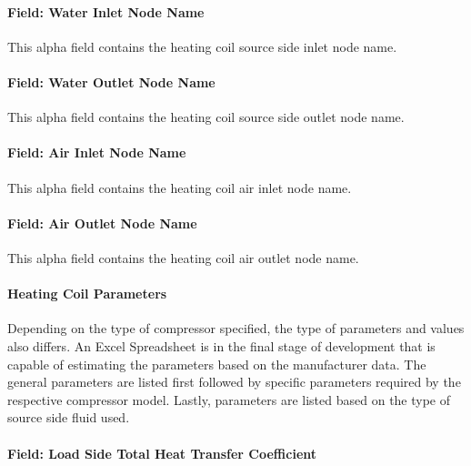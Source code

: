\paragraph{Field: Water Inlet Node Name}\label{field-water-inlet-node-name-8}

This alpha field contains the heating coil source side inlet node name.

\paragraph{Field: Water Outlet Node Name}\label{field-water-outlet-node-name-8}

This alpha field contains the heating coil source side outlet node name.

\paragraph{Field: Air Inlet Node Name}\label{field-air-inlet-node-name-19}

This alpha field contains the heating coil air inlet node name.

\paragraph{Field: Air Outlet Node Name}\label{field-air-outlet-node-name-19}

This alpha field contains the heating coil air outlet node name.

\paragraph{Heating Coil Parameters}\label{heating-coil-parameters}

Depending on the type of compressor specified, the type of parameters and values also differs. An Excel Spreadsheet is in the final stage of development that is capable of estimating the parameters based on the manufacturer data. The general parameters are listed first followed by specific parameters required by the respective compressor model. Lastly, parameters are listed based on the type of source side fluid used.

\paragraph{Field: Load Side Total Heat Transfer Coefficient}\label{field-load-side-total-heat-transfer-coefficient-1}

